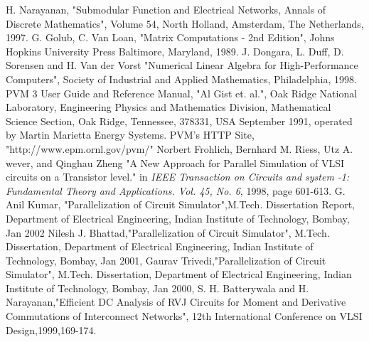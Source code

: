 \documentclass[12pt,psfig,a4]{article}
\begin{document}
\begin{thebibliography}{}

 H. Narayanan, "Submodular Function and Electrical
Networks, Annals of Discrete Mathematics", Volume 54, North Holland, Amsterdam, The Netherlands, 1997.
 G. Golub, C. Van Loan, "Matrix Computations - 2nd Edition", Johns Hopkins University Press Baltimore,
 Maryland, 1989.
 J. Dongara, L. Duff, D. Sorensen and H. Van der Vorst
"Numerical Linear Algebra for High-Performance Computers", Society of Industrial and Applied Mathematics, Philadelphia, 1998.
PVM 3 User Guide and Reference Manual, "Al Gist et. al.",
Oak Ridge National Laboratory, Engineering Physics and Mathematics
Division, Mathematical Science Section, Oak Ridge, Tennessee, 378331, USA
September 1991, operated by Martin Marietta Energy Systems.
PVM's HTTP Site, "http://www.epm.ornl.gov/pvm/"
 Norbert Frohlich, Bernhard M. Riess, Utz A. wever, and 
Qinghau Zheng "A New Approach for Parallel Simulation of VLSI circuits on a 
Transistor level." in {\it IEEE Transaction on Circuits and system -1:
Fundamental Theory and Applications. Vol. 45, No. 6}, 1998, page 601-613.
 G. Anil Kumar, "Parallelization of Circuit Simulator",M.Tech. Dissertation Report,
Department of Electrical Engineering, Indian Institute of Technology, Bombay, Jan 2002
Nilesh J. Bhattad,"Parallelization of Circuit Simulator", M.Tech. Dissertation,
Department of Electrical Engineering, Indian Institute of Technology, Bombay, Jan 2001, 
Gaurav Trivedi,"Parallelization of Circuit Simulator", M.Tech. Dissertation,
Department of Electrical Engineering, Indian Institute of Technology, Bombay, Jan 2000, 
 S. H. Batterywala and H. Narayanan,"Efficient DC Analysis of RVJ Circuits for Moment and Derivative
Commutations of Interconnect Networks", 12th International Conference on VLSI Design,1999,169-174.


\end{thebibliography}   
\end{document}
